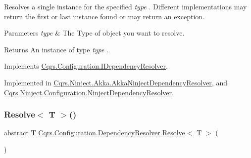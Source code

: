 Resolves a single instance for the specified {\itshape type} . Different implementations may return the first or last instance found or may return an exception. 


\begin{DoxyParams}{Parameters}
{\em type} & The Type of object you want to resolve.\\
\hline
\end{DoxyParams}
\begin{DoxyReturn}{Returns}
An instance of type {\itshape type} .
\end{DoxyReturn}


Implements \hyperlink{interfaceCqrs_1_1Configuration_1_1IDependencyResolver_aa455096b7b94fc1d64904bc67830ec06_aa455096b7b94fc1d64904bc67830ec06}{Cqrs.\+Configuration.\+I\+Dependency\+Resolver}.



Implemented in \hyperlink{classCqrs_1_1Ninject_1_1Akka_1_1AkkaNinjectDependencyResolver_adace29de71f10e34e952bd41e48106a6_adace29de71f10e34e952bd41e48106a6}{Cqrs.\+Ninject.\+Akka.\+Akka\+Ninject\+Dependency\+Resolver}, and \hyperlink{classCqrs_1_1Ninject_1_1Configuration_1_1NinjectDependencyResolver_ab9da7f1556cc1ef205d03d3ff62017c0_ab9da7f1556cc1ef205d03d3ff62017c0}{Cqrs.\+Ninject.\+Configuration.\+Ninject\+Dependency\+Resolver}.

\mbox{\label{classCqrs_1_1Configuration_1_1DependencyResolver_a1eb177fc6c914b45d138642fb6d9454d_a1eb177fc6c914b45d138642fb6d9454d}} 
\subsubsection{\texorpdfstring{Resolve$<$ T $>$()}{Resolve< T >()}}
{\footnotesize\ttfamily abstract T \hyperlink{classCqrs_1_1Configuration_1_1DependencyResolver_aaeeb3ad2e0ef44bd98469d843210205c_aaeeb3ad2e0ef44bd98469d843210205c}{Cqrs.\+Configuration.\+Dependency\+Resolver.\+Resolve}$<$ T $>$ (\begin{DoxyParamCaption}{ }\end{DoxyParamCaption})\hspace{0.3cm}{\ttfamily [pure virtual]}}



